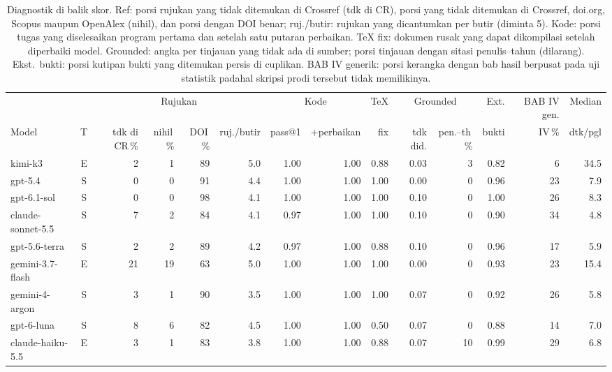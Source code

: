 \begin{table}[t]
  \caption{Diagnostik di balik skor. Ref: porsi rujukan yang tidak ditemukan di Crossref (tdk di CR), porsi yang tidak ditemukan di Crossref, doi.org, Scopus maupun OpenAlex (nihil), dan porsi dengan DOI benar; ruj./butir: rujukan yang dicantumkan per butir (diminta 5). Kode: porsi tugas yang diselesaikan program pertama dan setelah satu putaran perbaikan. TeX fix: dokumen rusak yang dapat dikompilasi setelah diperbaiki model. Grounded: angka per tinjauan yang tidak ada di sumber; porsi tinjauan dengan sitasi penulis--tahun (dilarang). Ekst.\ bukti: porsi kutipan bukti yang ditemukan persis di cuplikan. BAB IV generik: porsi kerangka dengan bab hasil berpusat pada uji statistik padahal skripsi prodi tersebut tidak memilikinya.}
  \label{tab:diagnostics}
  \centering
  \scriptsize
  \setlength{\tabcolsep}{3pt}
  \begin{tabular}{@{}l c r r r r r r r r r r r r@{}}
    \toprule
    & & \multicolumn{4}{c}{Rujukan} & \multicolumn{2}{c}{Kode} & TeX & \multicolumn{2}{c}{Grounded} & Ext. & BAB IV gen. & Median \\
    \cmidrule(lr){3-6}\cmidrule(lr){7-8}\cmidrule(lr){10-11}
    Model & T & tdk di CR\,\% & nihil\,\% & DOI\,\% & ruj./butir & pass@1 & +perbaikan & fix & tdk did. & pen.--th\,\% & bukti & IV\,\% & dtk/pgl \\
    \midrule
    kimi-k3 & E & 2 & 1 & 89 & 5.0 & 1.00 & 1.00 & 0.88 & 0.03 & 3 & 0.82 & 6 & 34.5 \\
    gpt-5.4 & S & 0 & 0 & 91 & 4.4 & 1.00 & 1.00 & 1.00 & 0.00 & 0 & 0.96 & 23 & 7.9 \\
    gpt-6.1-sol & S & 0 & 0 & 98 & 4.1 & 1.00 & 1.00 & 1.00 & 0.10 & 0 & 1.00 & 26 & 8.3 \\
    claude-sonnet-5.5 & S & 7 & 2 & 84 & 4.1 & 0.97 & 1.00 & 1.00 & 0.10 & 0 & 0.90 & 34 & 4.8 \\
    gpt-5.6-terra & S & 2 & 2 & 89 & 4.2 & 0.97 & 1.00 & 0.88 & 0.10 & 0 & 0.96 & 17 & 5.9 \\
    gemini-3.7-flash & E & 21 & 19 & 63 & 5.0 & 1.00 & 1.00 & 1.00 & 0.00 & 0 & 0.93 & 23 & 15.4 \\
    gemini-4-argon & S & 3 & 1 & 90 & 3.5 & 1.00 & 1.00 & 1.00 & 0.07 & 0 & 0.92 & 26 & 5.8 \\
    gpt-6-luna & S & 8 & 6 & 82 & 4.5 & 1.00 & 1.00 & 0.50 & 0.07 & 0 & 0.88 & 14 & 7.0 \\
    claude-haiku-5.5 & E & 3 & 1 & 83 & 3.8 & 1.00 & 1.00 & 0.88 & 0.07 & 10 & 0.99 & 29 & 6.8 \\

\end{tabular}
\end{table}
